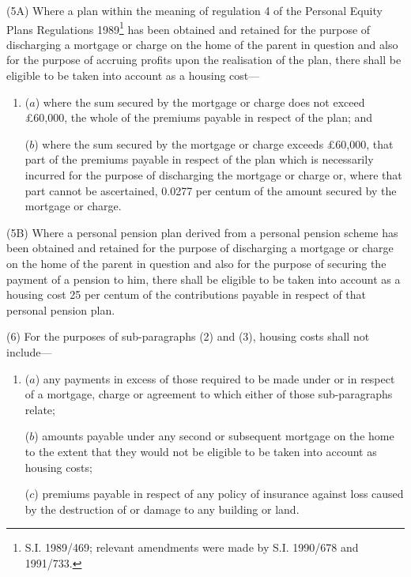 \documentclass[12pt,a4paper]{article}
\begin{document}
(5A) Where a plan within the meaning of regulation 4 of the Personal Equity Plans Regulations 1989\footnote{\frenchspacing S.I. 1989/469; relevant amendments were made by S.I. 1990/678 and 1991/733.} has been obtained and retained for the purpose of discharging a mortgage or charge on the home of the parent in question and also for the purpose of accruing profits upon the realisation of the plan, there shall be eligible to be taken into account as a housing cost—
\begin{enumerate}\item[]
($a$) where the sum secured by the mortgage or charge does not exceed £60,000, the whole of the premiums payable in respect of the plan; and

($b$) where the sum secured by the mortgage or charge exceeds £60,000, that part of the premiums payable in respect of the plan which is necessarily incurred for the purpose of discharging the mortgage or charge or, where that part cannot be ascertained, 0.0277 per centum of the amount secured by the mortgage or charge.
\end{enumerate}

(5B) Where a personal pension plan 
derived from a personal pension scheme  %
has been obtained and retained for the purpose of discharging a mortgage or charge on the home of the parent in question and also for the purpose of securing the payment of a pension to him, there shall be eligible to be taken into account as a housing cost 25 per centum of the contributions payable in respect of that personal pension plan.

(6) For the purposes of sub-paragraphs (2) and (3), housing costs shall not include—
\begin{enumerate}\item[]
($a$) 
any payments in excess of those required  %
to be made under or in respect of a mortgage, charge or agreement to which either of those sub-paragraphs relate;

($b$) 
amounts payable  %
under any second or subsequent mortgage on the home to the extent that 
they would not be eligible  %
to be taken into account as housing costs;

($c$) premiums payable in respect of any policy of insurance against loss caused by the destruction of or damage to any building or land.
\end{enumerate}
\end{document}
